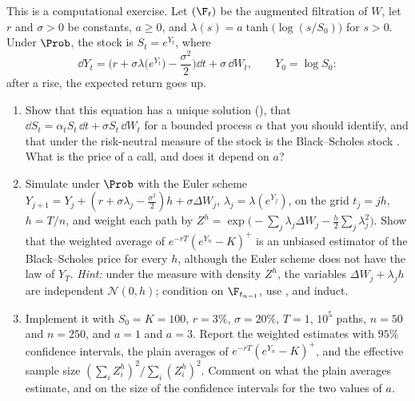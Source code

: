 \begin{exercise}\label{ex:rn-reweight-sim}
\medium This is a computational exercise. Let $(\F_t)$ be the augmented filtration of $W$, let
$r$ and $\sigma>0$ be constants, $a\ge0$, and $\lambda(s)=a\tanh\big(\log(s/S_0)\big)$ for
$s>0$. Under $\Prob$, the stock is $S_t=e^{Y_t}$, where
\[
  \dd Y_t=\Big(r+\sigma\lambda\big(e^{Y_t}\big)-\frac{\sigma^2}2\Big)\dd t+\sigma\,\dd W_t,
  \qquad Y_0=\log S_0 :
\]
after a rise, the expected return goes up.
\begin{enumerate}[label=(\alph*)]
  \item Show that this equation has a unique solution (), that
    $\dd S_t=\alpha_tS_t\,\dd t+\sigma S_t\,\dd W_t$ for a bounded process $\alpha$ that you
    should identify, and that under the risk-neutral measure of 
    the stock is the Black--Scholes stock . What is the price of a call,
    and does it depend on $a$?
  \item Simulate under $\Prob$ with the Euler scheme
    $Y_{j+1}=Y_j+(r+\sigma\lambda_j-\frac{\sigma^2}2)h+\sigma\Delta W_j$, $\lambda_j=\lambda(e^{Y_j})$,
    on the grid $t_j=jh$, $h=T/n$, and weight each path by
    $Z^h=\exp\big(-\sum_j\lambda_j\Delta W_j-\frac h2\sum_j\lambda_j^2\big)$. Show that the
    weighted average of $e^{-rT}(e^{Y_n}-K)^+$ is an unbiased estimator of the Black--Scholes
    price for every $h$, although the Euler scheme does not have the law of $Y_T$.
    \emph{Hint:} under the measure with density $Z^h$, the variables $\Delta W_j+\lambda_jh$
    are independent $\mathcal N(0,h)$; condition on $\F_{t_{n-1}}$, use
    , and induct.
  \item Implement it with $S_0=K=100$, $r=3\%$, $\sigma=20\%$, $T=1$, $10^5$ paths, $n=50$ and
    $n=250$, and $a=1$ and $a=3$. Report the weighted estimates with $95\%$ confidence
    intervals, the plain averages of $e^{-rT}(e^{Y_n}-K)^+$, and the effective sample size
    $(\sum_iZ^h_i)^2/\sum_i(Z^h_i)^2$. Comment on what the plain averages estimate, and on the
    size of the confidence intervals for the two values of $a$.
\end{enumerate}
\end{exercise}
